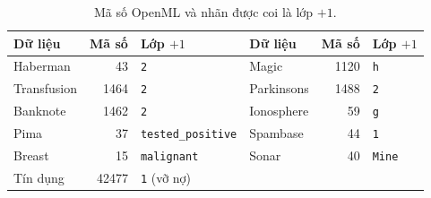 \begin{table}[h]
\centering
\caption[Mã số OpenML của các bộ dữ liệu]{Mã số OpenML và nhãn được coi là lớp $+1$.}
\label{tab:sources}
\small
\renewcommand{\arraystretch}{1.15}
\begin{tabular}{@{}l r l@{\qquad}l r l@{}}
\toprule
\textbf{Dữ liệu} & \textbf{Mã số} & \textbf{Lớp $+1$} & \textbf{Dữ liệu} & \textbf{Mã số} & \textbf{Lớp $+1$}\\
\midrule
Haberman & 43 & \texttt{2} & Magic & 1120 & \texttt{h}\\
Transfusion & 1464 & \texttt{2} & Parkinsons & 1488 & \texttt{2}\\
Banknote & 1462 & \texttt{2} & Ionosphere & 59 & \texttt{g}\\
Pima & 37 & \texttt{tested\_positive} & Spambase & 44 & \texttt{1}\\
Breast & 15 & \texttt{malignant} & Sonar & 40 & \texttt{Mine}\\
Tín dụng & 42477 & \texttt{1} (vỡ nợ) & & & \\
\bottomrule
\end{tabular}
\end{table}
